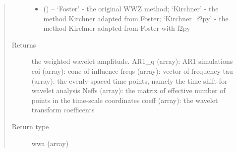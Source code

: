 \documentclass[letterpaper,10pt,english]{sphinxmanual}
\begin{document}
\begin{fulllineitems}
\begin{quote}
\begin{description}
\begin{itemize}
\item {} 
 () -- `Foster' - the original WWZ method;
`Kirchner' - the method Kirchner adapted from Foster;
`Kirchner\_f2py' - the method Kirchner adapted from Foster with f2py

\end{itemize}

\item[{Returns}] \leavevmode
the weighted wavelet amplitude.
AR1\_q (array): AR1 simulations
coi (array): cone of influence
freqs (array): vector of frequency
tau (array): the evenly-spaced time points, namely the time shift for wavelet analysis
Neffs (array): the matrix of effective number of points in the time-scale coordinates
coeff (array): the wavelet transform coefficents

\item[{Return type}] \leavevmode
wwa (array)

\end{description}\end{quote}

\end{fulllineitems}

\end{document}
